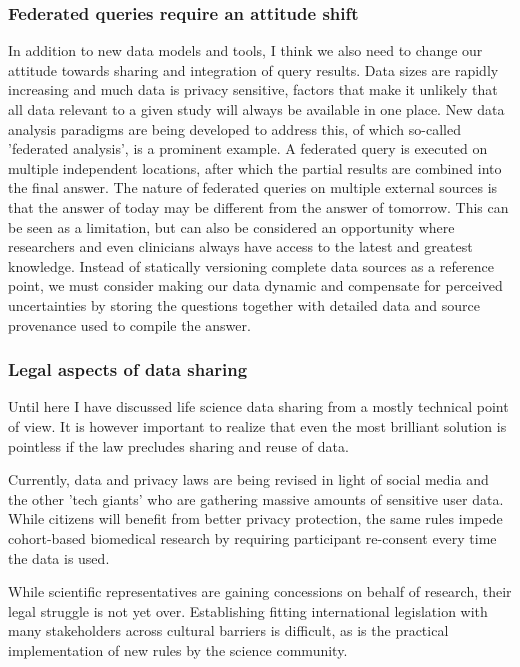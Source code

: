 \subsubsection*{Federated queries require an attitude shift}

In addition to new data models and tools, I think we also need to change our attitude towards sharing and integration of query results.
Data sizes are rapidly increasing and much data is privacy sensitive, factors that make it unlikely that all data relevant to a given study will always be available in one place.
New data analysis paradigms are being developed to address this, of which so-called 'federated analysis', is a prominent example\cite{Gaye_2014,Jochems_2016}.
A federated query is executed on multiple independent locations, after which the partial results are combined into the final answer.
The nature of federated queries on multiple external sources is that the answer of today may be different from the answer of tomorrow.
This can be seen as a limitation, but can also be considered an opportunity where researchers and even clinicians always have access to the latest and greatest knowledge.
Instead of statically versioning complete data sources as a reference point, we must consider making our data dynamic and compensate for perceived uncertainties by storing the questions together with detailed data and source provenance used to compile the answer.

\subsubsection*{Legal aspects of data sharing}

Until here I have discussed life science data sharing from a mostly technical point of view.
It is however important to realize that even the most brilliant solution is pointless if the law precludes sharing and reuse of data.

Currently, data and privacy laws are being revised in light of social media and the other 'tech giants' who are gathering massive amounts of sensitive user data.
While citizens will benefit from better privacy protection, the same rules impede cohort-based biomedical research by requiring participant re-consent every time the data is used\cite{natedit_2015}.

While scientific representatives are gaining concessions on behalf of research, their legal struggle is not yet over.
Establishing fitting international legislation with many stakeholders across cultural barriers is difficult, as is the practical implementation of new rules by the science community\cite{Litton_2017}.

